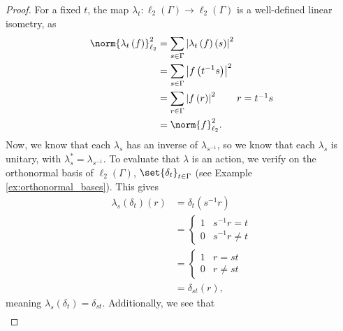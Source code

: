 \begin{proof}
  For a fixed $t$, the map $\lambda_t\colon \ell_2\left( \Gamma \right)\rightarrow \ell_2\left( \Gamma \right)$ is a well-defined linear isometry, as
  \begin{align*}
    \norm{\lambda_t\left( f \right)}_{\ell_2}^2 &= \sum_{s\in\Gamma}\left\vert \lambda_t\left( f \right)\left( s \right) \right\vert^2\\
                                                &= \sum_{s\in\Gamma}\left\vert f\left( t^{-1}s \right) \right\vert^2\\
                                                &= \sum_{r\in\Gamma}\left\vert f\left( r \right) \right\vert^2\tag*{$r = t^{-1}s$}\\
                                                &= \norm{f}_{\ell_2}^2.
  \end{align*}
  Now, we know that each $\lambda_s$ has an inverse of $\lambda_{s^{-1}}$, so we know that each $\lambda_s$ is unitary, with $\lambda_s^{\ast} = \lambda_{s^{-1}}$. To evaluate that $\lambda$ is an action, we verify on the orthonormal basis of $\ell_2\left( \Gamma \right)$, $\set{\delta_t}_{t\in\Gamma}$ (see Example \ref{ex:orthonormal_bases}). This gives
  \begin{align*}
    \lambda_s\left( \delta_t \right)\left( r \right) &= \delta_t\left( s^{-1}r \right)\\
                                                     &= \begin{cases}
                                                       1 & s^{-1}r = t\\
                                                       0 & s^{-1}r \neq t
                                                     \end{cases}\\
                                                     &= \begin{cases}
                                                       1 & r = st\\
                                                       0 & r\neq st
                                                     \end{cases}\\
                                                     &= \delta_{st}\left( r \right),
  \end{align*}
  meaning $\lambda_s\left( \delta_t \right) = \delta_{st}$. Additionally, we see that
  \begin{align*}

\end{align*}
\end{proof}
